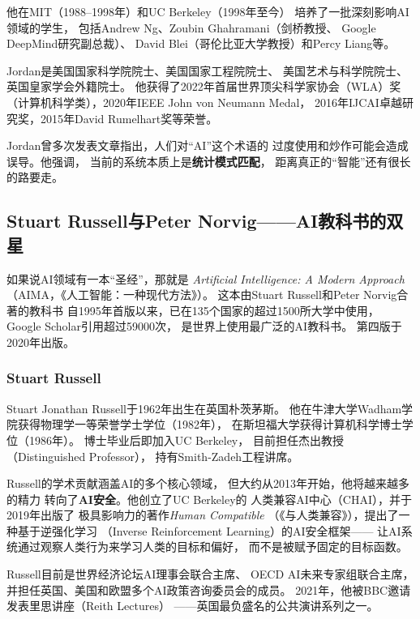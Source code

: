 他在MIT（1988--1998年）和UC Berkeley（1998年至今）
培养了一批深刻影响AI领域的学生，
包括Andrew Ng、Zoubin Ghahramani（剑桥教授、
Google DeepMind研究副总裁）、
David Blei（哥伦比亚大学教授）和Percy Liang等。

Jordan是美国国家科学院院士、美国国家工程院院士、
美国艺术与科学院院士、英国皇家学会外籍院士。
他获得了2022年首届世界顶尖科学家协会（WLA）奖
（计算机科学类），2020年IEEE John von Neumann Medal，
2016年IJCAI卓越研究奖，2015年David Rumelhart奖等荣誉。

Jordan曾多次发表文章指出，人们对``AI''这个术语的
过度使用和炒作可能会造成误导。他强调，
当前的系统本质上是\textbf{统计模式匹配}，
距离真正的``智能''还有很长的路要走。

\bigskip

\subsection{Stuart Russell与Peter Norvig——AI教科书的双星}
\label{sec:russell-norvig}

如果说AI领域有一本``圣经''，那就是
\textit{Artificial Intelligence: A Modern Approach}
（AIMA，《人工智能：一种现代方法》）。
这本由Stuart Russell和Peter Norvig合著的教科书
自1995年首版以来，已在135个国家的超过1500所大学中使用，
Google Scholar引用超过59000次，
是世界上使用最广泛的AI教科书。
第四版于2020年出版。

\subsubsection{Stuart Russell}
Stuart Jonathan Russell于1962年出生在英国朴茨茅斯。
他在牛津大学Wadham学院获得物理学一等荣誉学士学位（1982年），
在斯坦福大学获得计算机科学博士学位（1986年）。
博士毕业后即加入UC Berkeley，
目前担任杰出教授（Distinguished Professor），
持有Smith-Zadeh工程讲席。

Russell的学术贡献涵盖AI的多个核心领域，
但大约从2013年开始，他将越来越多的精力
转向了\textbf{AI安全}。他创立了UC Berkeley的
人类兼容AI中心（CHAI），并于2019年出版了
极具影响力的著作\textit{Human Compatible}
（《与人类兼容》），提出了一种基于逆强化学习
（Inverse Reinforcement Learning）的AI安全框架——
让AI系统通过观察人类行为来学习人类的目标和偏好，
而不是被赋予固定的目标函数。

Russell目前是世界经济论坛AI理事会联合主席、
OECD AI未来专家组联合主席，
并担任英国、美国和欧盟多个AI政策咨询委员会的成员。
2021年，他被BBC邀请发表里思讲座（Reith Lectures）
——英国最负盛名的公共演讲系列之一。

